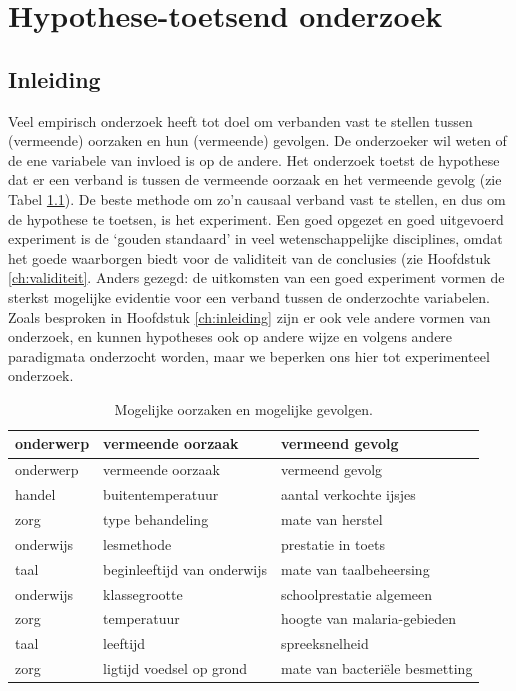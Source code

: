 \documentclass[
]{book}
\begin{document}
\hypertarget{ch:onderzoek}{%
\chapter{Hypothese-toetsend onderzoek}\label{ch:onderzoek}}

\hypertarget{inleiding}{%
\section{Inleiding}\label{inleiding}}

Veel empirisch onderzoek heeft tot doel om verbanden vast te stellen
tussen (vermeende) oorzaken en hun (vermeende) gevolgen. De onderzoeker
wil weten of de ene variabele van invloed is op de andere. Het onderzoek
toetst de hypothese dat er een verband is tussen de vermeende oorzaak en
het vermeende gevolg (zie Tabel \ref{tab:oorzaakgevolg}).
De beste methode om zo'n causaal verband vast
te stellen, en dus om de hypothese te toetsen, is het experiment. Een
goed opgezet en goed uitgevoerd experiment is de `gouden standaard' in
veel wetenschappelijke disciplines, omdat het goede waarborgen biedt
voor de validiteit van de conclusies (zie
Hoofdstuk \ref{ch:validiteit}.
Anders gezegd: de uitkomsten van een goed
experiment vormen de sterkst mogelijke evidentie voor een verband tussen
de onderzochte variabelen. Zoals besproken in
Hoofdstuk \ref{ch:inleiding} zijn er ook vele andere vormen van onderzoek,
en kunnen hypotheses ook op andere wijze en volgens andere paradigmata
onderzocht worden, maar we beperken ons hier tot experimenteel
onderzoek.

\begin{longtable}[]{@{}lll@{}}
\caption{\label{tab:oorzaakgevolg} Mogelijke oorzaken en mogelijke gevolgen.}\tabularnewline
\toprule
onderwerp & vermeende oorzaak & vermeend gevolg\tabularnewline
\midrule
\endfirsthead
\toprule
onderwerp & vermeende oorzaak & vermeend gevolg\tabularnewline
\midrule
\endhead
handel & buitentemperatuur & aantal verkochte ijsjes\tabularnewline
zorg & type behandeling & mate van herstel\tabularnewline
onderwijs & lesmethode & prestatie in toets\tabularnewline
taal & beginleeftijd van onderwijs & mate van taalbeheersing\tabularnewline
onderwijs & klassegrootte & schoolprestatie algemeen\tabularnewline
zorg & temperatuur & hoogte van malaria-gebieden\tabularnewline
taal & leeftijd & spreeksnelheid\tabularnewline
zorg & ligtijd voedsel op grond & mate van bacteriële besmetting\tabularnewline
\bottomrule
\end{longtable}
\end{document}
